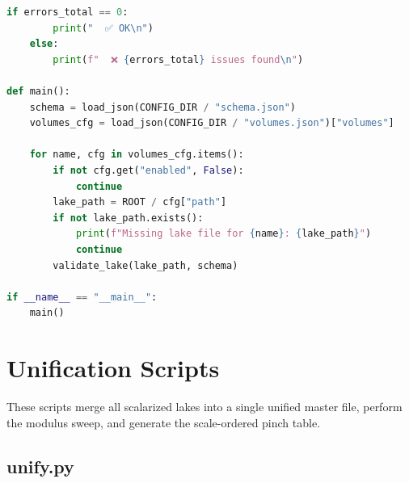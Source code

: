 \documentclass[11pt, letterpaper, openany]{book}
\begin{document}
\begin{lstlisting}[language=Python]
    if errors_total == 0:
        print("  ✅ OK\n")
    else:
        print(f"  ❌ {errors_total} issues found\n")

def main():
    schema = load_json(CONFIG_DIR / "schema.json")
    volumes_cfg = load_json(CONFIG_DIR / "volumes.json")["volumes"]

    for name, cfg in volumes_cfg.items():
        if not cfg.get("enabled", False):
            continue
        lake_path = ROOT / cfg["path"]
        if not lake_path.exists():
            print(f"Missing lake file for {name}: {lake_path}")
            continue
        validate_lake(lake_path, schema)

if __name__ == "__main__":
    main()
\end{lstlisting}

\section{Unification Scripts}

These scripts merge all scalarized lakes into a single unified master file,
perform the modulus sweep, and generate the scale-ordered pinch table.

\subsection{unify.py}
\end{document}
